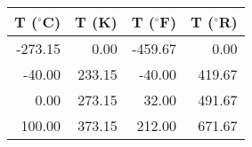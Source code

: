 \begin{tabular}{|rrrr|}\hline 
T ($^{\circ}$C) & T (K) & T ($^{\circ}$F) & T ($^{\circ}$R)\\ \hline 
 -273.15 &     0.00 &  -459.67 &     0.00 \\ 
  -40.00 &   233.15 &   -40.00 &   419.67 \\ 
    0.00 &   273.15 &    32.00 &   491.67 \\ 
  100.00 &   373.15 &   212.00 &   671.67 \\ \hline 
\end{tabular}
